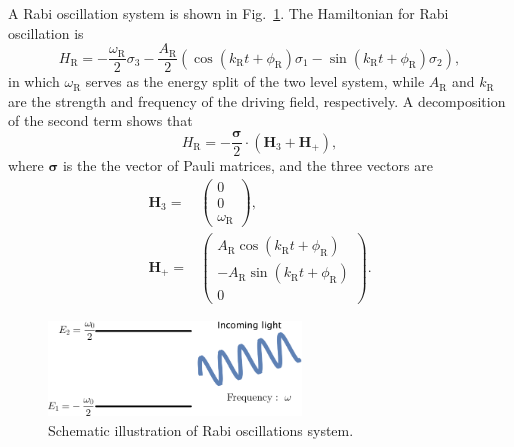 A Rabi oscillation system is shown in Fig.~\ref{chap:app-sec:rabi-oscillations-fig:rabi-diagram}. The Hamiltonian for Rabi oscillation is
\begin{equation}
    H_{\mathrm R} = -\frac{\omega_{\mathrm R}}{2}\sigma_3 - \frac{A_{\mathrm{R}} }{2}  \left( \cos(k_{\mathrm{R}} t +\phi_{\mathrm{R}})\sigma_1  - \sin(k_{\mathrm{R}} t +\phi_{\mathrm{R}}) \sigma_2\right),
    \label{rabi-oscillation-single-perturbation}
\end{equation}
in which $\omega_{\mathrm R}$ serves as the energy split of the two level system, while $A_{\mathrm{R}}$ and $k_{\mathrm{R}}$ are the strength and frequency of the driving field, respectively. A decomposition of the second term shows that
\begin{equation*}
H_{\mathrm R}
= - \frac{\boldsymbol{\sigma}}{2} \cdot (\mathbf{H}_3 + \mathbf{H}_+ ) ,
\end{equation*}
where $\boldsymbol{\sigma}$ is the the vector of Pauli matrices, and the three vectors are
\begin{align}
    \mathbf{H}_3 = & \begin{pmatrix}
    0 \\ 0 \\ \omega_{\mathrm R}
    \end{pmatrix}, \\
    \mathbf{H}_+ = & \begin{pmatrix}
    A_{\mathrm{R}} \cos(k_{\mathrm{R}} t +\phi_{\mathrm{R}}) \\
    - A_{\mathrm{R}} \sin(k_{\mathrm{R}} t +\phi_{\mathrm{R}}) \\
    0
    \end{pmatrix}.
\end{align}

\begin{figure}[htbp]
    \centering
    \includegraphics[width=0.6\textwidth]{chapters/assets/app/rabi-diagram.png}
    \caption{Schematic illustration of Rabi oscillations system.}
    \label{chap:app-sec:rabi-oscillations-fig:rabi-diagram}
\end{figure}

